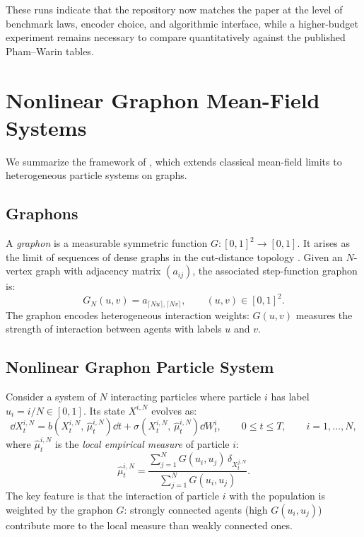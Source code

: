 \documentclass[11pt]{article}
\begin{document}
These runs indicate that the repository now matches the paper at the level of benchmark laws, encoder choice, and algorithmic interface, while a higher-budget experiment remains necessary to compare quantitatively against the published Pham--Warin tables.


\section{Nonlinear Graphon Mean-Field Systems}\label{sec:appendix-graphon}

We summarize the framework of \citet{coppini2025graphon}, which extends classical mean-field limits to heterogeneous particle systems on graphs.

\subsection{Graphons}

A \emph{graphon} is a measurable symmetric function $G : [0,1]^2 \to [0,1]$. It arises as the limit of sequences of dense graphs in the cut-distance topology \citep{lovasz2012large}. Given an $N$-vertex graph with adjacency matrix $(a_{ij})$, the associated step-function graphon is:
\begin{equation}
  G_N(u,v) = a_{\lceil Nu \rceil, \lceil Nv \rceil}, \qquad (u,v) \in [0,1]^2.
\end{equation}
The graphon encodes heterogeneous interaction weights: $G(u,v)$ measures the strength of interaction between agents with labels $u$ and $v$.

\subsection{Nonlinear Graphon Particle System}

Consider a system of $N$ interacting particles where particle $i$ has label $u_i = i/N \in [0,1]$. Its state $X^{i,N}$ evolves as:
\begin{equation}\label{eq:graphon-particle}
  \dd X_t^{i,N} = b\!\left(X_t^{i,N}, \, \hat{\mu}_t^{i,N}\right)\dd t + \sigma\!\left(X_t^{i,N}, \, \hat{\mu}_t^{i,N}\right)\dd W_t^i, \qquad 0 \leq t \leq T, \qquad i = 1, \ldots, N,
\end{equation}
where $\hat{\mu}_t^{i,N}$ is the \emph{local empirical measure} of particle $i$:
\begin{equation}\label{eq:local-empirical}
  \hat{\mu}_t^{i,N} = \frac{\sum_{j=1}^N G(u_i, u_j)\,\delta_{X_t^{j,N}}}{\sum_{j=1}^N G(u_i, u_j)}.
\end{equation}
The key feature is that the interaction of particle $i$ with the population is weighted by the graphon $G$: strongly connected agents (high $G(u_i, u_j)$) contribute more to the local measure than weakly connected ones.
\end{document}
